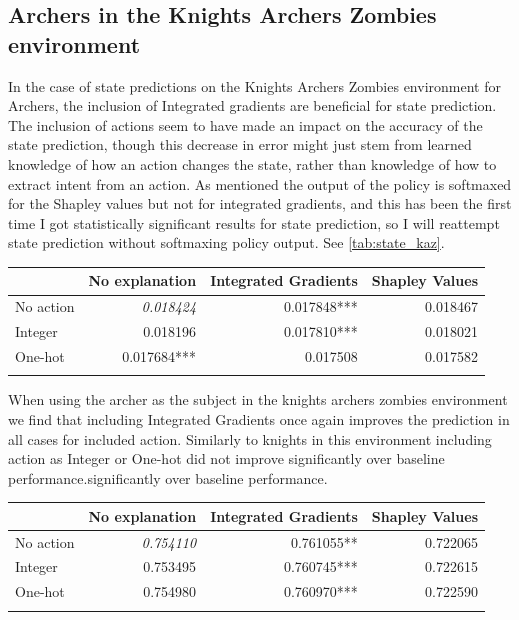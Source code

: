 \documentclass[UKenglish]{uiomasterthesis}
\begin{document}
\subsection{Archers in the Knights Archers Zombies environment}

In the case of state predictions on the Knights Archers Zombies environment for Archers, the inclusion of Integrated gradients are beneficial for state prediction. The inclusion of actions seem to have made an impact on the accuracy of the state prediction, though this decrease in error might just stem from learned knowledge of how an action changes the state, rather than knowledge of how to extract intent from an action. As mentioned the output of the policy is softmaxed for the Shapley values but not for integrated gradients, and this has been the first time I got statistically significant results for state prediction, so I will reattempt state prediction without softmaxing policy output. See \cref{tab:state_kaz}.

\begin{center}
\label{tab:state_kaz}
\begin{tabular}{lrrr}
\toprule
 & No explanation & Integrated Gradients & Shapley Values \\
\midrule
    No action & \textit{0.018424} & 0.017848*** & 0.018467 \\
Integer & 0.018196 & 0.017810*** & 0.018021 \\
One-hot & 0.017684*** & 0.017508 & 0.017582 \\
\bottomrule
\addlinespace[2pt]
\multicolumn{3}{l}{\textsuperscript{***}$p<0.001$, 
  \textsuperscript{**}$p<0.01$, 
  \textsuperscript{*}$p<0.05$}
\end{tabular}
\end{center}

When using the archer as the subject in the knights archers zombies environment we find that including Integrated Gradients once again improves the prediction in all cases for included action. Similarly to knights in this environment including action as Integer or One-hot did not improve significantly over baseline performance.significantly over baseline performance.

\begin{center}
\label{tab:event_kaz_arch}
\begin{tabular}{lrrr}
\toprule
 & No explanation & Integrated Gradients & Shapley Values \\
\midrule
No action & \textit{0.754110} & 0.761055** & 0.722065 \\
Integer & 0.753495 & 0.760745*** & 0.722615 \\
One-hot & 0.754980 & 0.760970*** & 0.722590 \\
\bottomrule
\addlinespace[2pt]
\multicolumn{3}{l}{\textsuperscript{***}$p<0.001$, 
  \textsuperscript{**}$p<0.01$, 
  \textsuperscript{*}$p<0.05$}
\end{tabular}
\end{center}
\end{document}
